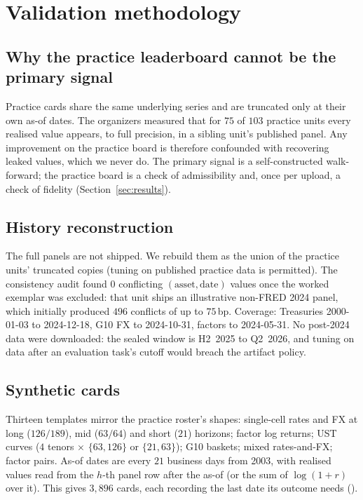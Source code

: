\section{Validation methodology}\label{sec:validation}

\subsection{Why the practice leaderboard cannot be the primary signal}

Practice cards share the same underlying series and are truncated only at their own as-of dates. The organizers measured that for $75$ of $103$
practice units every realised value appears, to full precision, in a sibling unit's published panel. Any improvement on the practice board is
therefore confounded with recovering leaked values, which we never do. The primary signal is a self-constructed walk-forward; the practice board
is a check of admissibility and, once per upload, a check of fidelity (Section~\ref{sec:results}).

\subsection{History reconstruction}

The full panels are not shipped. We rebuild them as the union of the practice units' truncated copies (tuning on published practice data is
permitted). The consistency audit found $0$ conflicting $(\text{asset},\text{date})$ values once the worked exemplar was excluded: that unit ships an
illustrative non-FRED 2024 panel, which initially produced $496$ conflicts of up to $75$\,bp. Coverage: Treasuries 2000-01-03 to 2024-12-18, G10 FX to
2024-10-31, factors to 2024-05-31. No post-2024 data were downloaded: the sealed window is H2~2025 to Q2~2026, and tuning on data after an evaluation
task's cutoff would breach the artifact policy.

\subsection{Synthetic cards}

Thirteen templates mirror the practice roster's shapes: single-cell rates and FX at long ($126/189$), mid ($63/64$) and short ($21$) horizons;
factor log returns; UST curves ($4$ tenors $\times$ $\{63,126\}$ or $\{21,63\}$); G10 baskets; mixed rates-and-FX; factor pairs. As-of dates are every $21$
business days from 2003, with realised values read from the $h$-th panel row after the as-of (or the sum of $\log(1+r)$ over it). This gives
$3{,}896$ cards, each recording the last date its outcome needs ().


